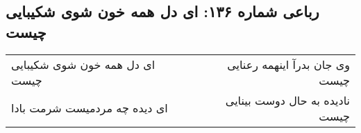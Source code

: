 \begin{center}
\section*{رباعی شماره ۱۳۶: ای دل همه خون شوی شکیبایی چیست}
\label{sec:sh136}
\begin{longtable}{l p{0.5cm} r}
ای دل همه خون شوی شکیبایی چیست
&&
وی جان بدرآ اینهمه رعنایی چیست
\\
ای دیده چه مردمیست شرمت بادا
&&
نادیده به حال دوست بینایی چیست
\\
\end{longtable}
\end{center}
